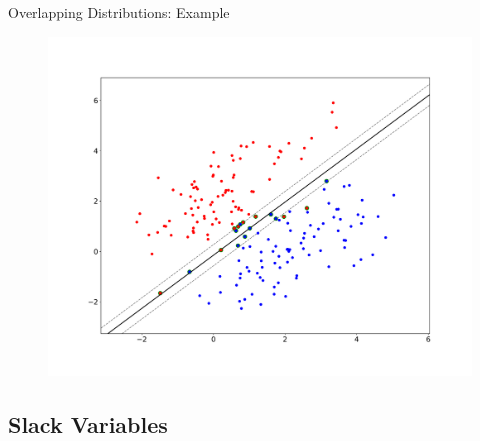 \begin{frame}{Overlapping Distributions: Example}{}
	\vspace*{-2mm}
	\begin{figure}
		\centering
		\includegraphics[scale=0.2]{11_svm/02_img/soft_margin}
	\end{figure}
\end{frame}


\subsection{Slack Variables}


